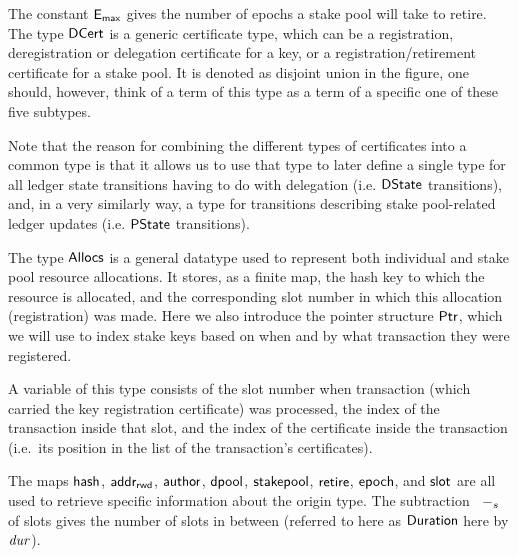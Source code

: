 The constant $\mathsf{E_{max}}$ gives the number of epochs a stake pool will take to retire.
The type $\mathsf{DCert}$ is a generic certificate type, which can be a registration,
deregistration or delegation certificate for a key, or a registration/retirement
 certificate for a stake pool. It is denoted as disjoint union in the figure,
one should, however, think of a term of this type as a term of a specific
one of these five subtypes.

Note that the reason for combining the different types of
certificates into a common type is that it allows us to use that type to later
define a single type for all
ledger state transitions having to do with delegation (i.e. $\mathsf{DState}$
transitions),
and, in a very similarly
way, a type for transitions describing stake pool-related ledger updates
(i.e. $\mathsf{PState}$ transitions).

The type $\mathsf{Allocs}$ is a general datatype used to represent both individual and stake
pool resource allocations. It stores, as a finite map, the hash key to which the resource is
allocated, and the corresponding slot number in which this allocation
(registration) was made. Here we also introduce the pointer structure
$\mathsf{Ptr}$, which we will use to index stake keys based on
when and by what transaction they were registered.

A variable of this type consists of
the slot number when transaction (which carried the key registration certificate)
was processed, the index of the transaction inside that slot, and the index
of the certificate inside the transaction (i.e.\ its position in the list of
the transaction's certificates).

The maps $\mathsf{hash}$, $\mathsf{addr_{rwd}}$, $\mathsf{author}$, $\mathsf{dpool}$,
$\mathsf{stakepool}$,
$\mathsf{retire}$, $\mathsf{epoch}$, and $\mathsf{slot}$ are all used to
retrieve specific information about the origin type. The subtraction $\mathit{}~-_{s}~\mathit{}$
of slots gives the number of slots in between (referred to here as
$\mathsf{Duration}$ here by $\mathit{dur}$).

